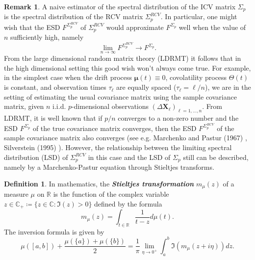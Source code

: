 \documentclass[a4paper,11pt]{book}
\theoremstyle{plain}
\theoremstyle{definition}
\newtheorem{defn}[thm]{Definition}
\newtheorem{rmrk}[thm]{Remark}
\newcommand{\MR}{\mathbb{R}}
\newcommand{\define}[1]{\textit{\textbf{#1}}}
\begin{document}
	\begin{rmrk}
		A naive estimator of the spectral distribution of the ICV matrix $\Sigma_p$ is the spectral distribution of the RCV matrix $\Sigma_p^{RCV}$. In particular, one might wish that the ESD $F^{\Sigma_p^{RCV}}$ of $\Sigma_p^{RCV}$ would approximate $F^{\Sigma_p}$ well when the value of $n$ sufficiently high, namely
		\[ \lim_{n \rightarrow \infty} F^{\Sigma_p^{RCV}} \rightarrow F^{\Sigma_p}. \]
		From the large dimensional random matrix theory (LDRMT) it follows that in the high dimensional setting this good wish won't always come true. For example, in the simplest case when the drift process $\boldsymbol{\mu}(t) \equiv 0$, covolatility process $\Theta(t)$ is constant, and observation times $\tau_\ell$ are equally spaced ($\tau_\ell = \ell / n$), we are in the setting of estimating the usual covariance matrix using the sample covariance matrix, given $n$ i.i.d. $p$-dimensional observations $(\Delta \mathbf{X}_\ell)_{\ell=1, \dots, n}$. From LDRMT, it is well known that if $p/n$ converges to a non-zero number and the ESD $F^{\Sigma_p}$ of the true covariance matrix converges, then the ESD $F^{\Sigma_p^{RCV}}$ of the sample covariance matrix also converges (see e.g. Marchenko and Pastur (1967) \cite{MarchenkoPastur}, Silverstein (1995) \cite{Silverstein}). However, the relationship between the limiting spectral distribution (LSD) of $\Sigma_p^{RCV}$ in this case and the LSD of $\Sigma_p$ still can be described, namely by a Marchenko-Pastur equation through Stieltjes transforms.
	\end{rmrk}
	
	\begin{defn}
		In mathematics, the \define{Stieltjes transformation} $m_\mu(z)$ of a measure $\mu$ on $\MR$ is the function of the complex variable $z \in \mathbb{C}_+ \coloneqq \{ z \in \mathbb{C} : \Im(z)>0 \}$ defined by the formula
		\[  
		m_\mu(z) = \int_{t \in \MR} \frac{1}{t - z} d\mu(t).
		\]
		The inversion formula is given by
		\begin{equation} \label{inverse Stieltjes transform}
		\mu([a, b]) + \frac{\mu(\{a\}) + \mu(\{b\})}{2}  = \frac{1}{\pi} \lim_{\eta \rightarrow 0^+} \int_{a}^{b} \Im (m_\mu(z+i\eta)) dz.
		\end{equation}
	\end{defn}
	
\end{document}
